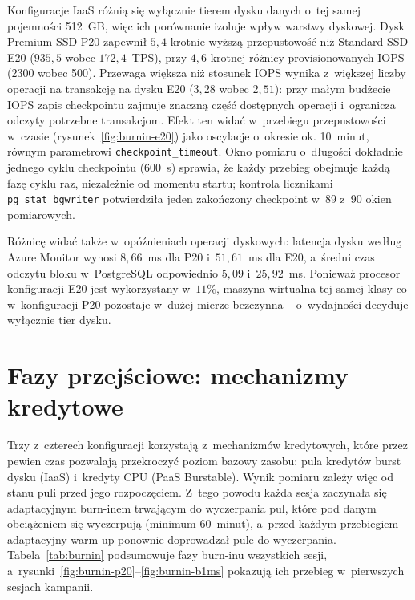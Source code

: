 Konfiguracje IaaS różnią się wyłącznie tierem dysku danych o~tej samej pojemności 512~GB,
więc ich porównanie izoluje wpływ warstwy dyskowej. Dysk Premium SSD P20 zapewnił
$5{,}4$-krotnie wyższą przepustowość niż Standard SSD E20 ($935{,}5$ wobec $172{,}4$~TPS),
przy $4{,}6$-krotnej różnicy provisionowanych IOPS (2300 wobec 500). Przewaga większa niż
stosunek IOPS wynika z~większej liczby operacji na transakcję na dysku E20 ($3{,}28$ wobec
$2{,}51$): przy małym budżecie IOPS zapis checkpointu zajmuje znaczną część dostępnych
operacji i~ogranicza odczyty potrzebne transakcjom. Efekt ten widać w~przebiegu
przepustowości w~czasie (rysunek~\ref{fig:burnin-e20}) jako oscylacje o~okresie ok. 10~minut,
równym parametrowi \texttt{checkpoint\_timeout}. Okno pomiaru o~długości dokładnie jednego
cyklu checkpointu (600~s) sprawia, że każdy przebieg obejmuje każdą fazę cyklu raz,
niezależnie od momentu startu; kontrola licznikami \texttt{pg\_stat\_bgwriter} potwierdziła
jeden zakończony checkpoint w~89 z~90 okien pomiarowych.

Różnicę widać także w~opóźnieniach operacji dyskowych: latencja dysku według Azure Monitor
wynosi $8{,}66$~ms dla P20 i~$51{,}61$~ms dla E20, a~średni czas odczytu bloku w~PostgreSQL
odpowiednio $5{,}09$ i~$25{,}92$~ms. Ponieważ procesor konfiguracji E20 jest wykorzystany
w~$11\%$, maszyna wirtualna tej samej klasy co w~konfiguracji P20 pozostaje w~dużej mierze
bezczynna -- o~wydajności decyduje wyłącznie tier dysku.

\section{Fazy przejściowe: mechanizmy kredytowe}
\label{sec:wyniki-bursting}

Trzy z~czterech konfiguracji korzystają z~mechanizmów kredytowych, które przez pewien czas
pozwalają przekroczyć poziom bazowy zasobu: pula kredytów burst dysku (IaaS) i~kredyty CPU
(PaaS Burstable). Wynik pomiaru zależy więc od stanu puli przed jego rozpoczęciem. Z~tego
powodu każda sesja zaczynała się adaptacyjnym burn-inem trwającym do wyczerpania pul, które
pod danym obciążeniem się wyczerpują (minimum 60~minut), a~przed każdym przebiegiem
adaptacyjny warm-up ponownie doprowadzał pule do wyczerpania. Tabela~\ref{tab:burnin}
podsumowuje fazy burn-inu wszystkich sesji, a~rysunki~\ref{fig:burnin-p20}--\ref{fig:burnin-b1ms}
pokazują ich przebieg w~pierwszych sesjach kampanii.

\begin{table}[htbp]
  \centering
  \caption{Fazy burn-inu: liczba i~czas trwania burn-inów, moment wyczerpania puli kredytów oraz średnia przepustowość przed wyczerpaniem i~po nim (wartości z~burn-inu, bez resetu stanu bazy -- nie są bezpośrednio porównywalne z~przebiegami pomiarowymi)}
  \label{tab:burnin}
  \small
  
\end{table}

